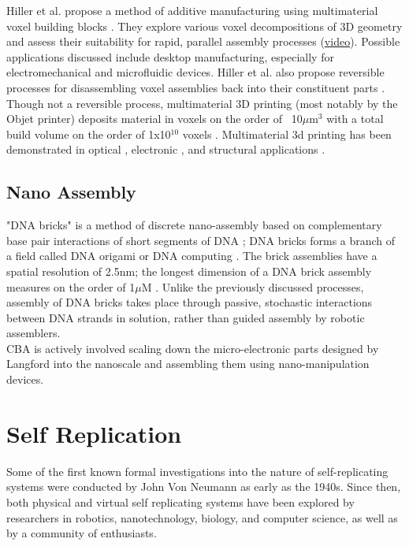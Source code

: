 {Hiller et al. propose a method of additive manufacturing using multimaterial voxel building blocks \cite{Hiller2009a}.  They explore various voxel decompositions of 3D geometry and assess their suitability for rapid, parallel assembly processes (\href{https://www.youtube.com/watch?v=-szjlhVMGh4}{video}).  Possible applications discussed include desktop manufacturing, especially for electromechanical and microfluidic devices.  Hiller et al. also propose reversible processes for disassembling voxel assemblies back into their constituent parts \cite{Hiller2005}.
\\

Though not a reversible process, multimaterial 3D printing (most notably by the Objet printer) deposits material in voxels on the order of ~10$\mu$m$^{3}$ with a total build volume on the order of 1x10$^{10}$ voxels \cite{Objet1000}.  Multimaterial 3d printing has been demonstrated in optical \cite{Willis2012}, electronic \cite{Ahn2009}, and structural applications \cite{Skouras2013} \cite{Schumacher} \cite{Bacher2014}.

\subsection{Nano Assembly}

"DNA bricks" is a method of discrete nano-assembly based on complementary base pair interactions of short segments of DNA \cite{Ke2012}; DNA bricks forms a branch of a field called DNA origami \cite{Rothemund2006} or DNA computing \cite{Seeman1982} \cite{Adleman1994}.  The brick assemblies have a spatial resolution of 2.5nm; the longest dimension of a DNA brick assembly measures on the order of 1$\mu$M \cite{Ke2014}.  Unlike the previously discussed processes, assembly of DNA bricks takes place through passive, stochastic interactions between DNA strands in solution, rather than guided assembly by robotic assemblers.
\\

CBA is actively involved scaling down the micro-electronic parts designed by Langford \cite{Langford2014} into the nanoscale and assembling them using nano-manipulation devices.

\section{Self Replication}

Some of the first known formal investigations into the nature of self-replicating systems were conducted by John Von Neumann as early as the 1940s.  Since then, both physical and virtual self replicating systems have been explored by researchers in robotics, nanotechnology, biology, and computer science, as well as by a community of enthusiasts.\\

}
